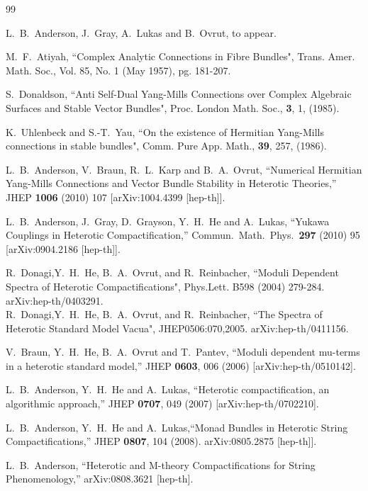 \documentclass[12pt]{article}
\numberwithin{equation}{section}
\begin{document}
\begin{thebibliography}{99}
   
L.~B.~Anderson, J.~Gray, A.~Lukas and B.~Ovrut, to appear.


M.~F.~Atiyah,
``Complex Analytic Connections in Fibre Bundles",
Trans. Amer. Math. Soc., Vol. 85, No. 1 (May 1957), pg. 181-207.

S.~Donaldson,
``Anti Self-Dual Yang-Mills Connections over Complex Algebraic Surfaces and Stable Vector Bundles",
Proc. London Math. Soc., {\bf 3}, 1, (1985).

K.~Uhlenbeck and S.-T.~Yau,
``On the existence of Hermitian Yang-Mills connections in stable bundles", Comm. Pure App. Math., {\bf 39}, 257, (1986).

  L.~B.~Anderson, V.~Braun, R.~L.~Karp and B.~A.~Ovrut,
  ``Numerical Hermitian Yang-Mills Connections and Vector Bundle Stability in
  Heterotic Theories,''
  JHEP {\bf 1006} (2010) 107
  [arXiv:1004.4399 [hep-th]].

  L.~B.~Anderson, J.~Gray, D.~Grayson, Y.~H.~He and A.~Lukas,
  ``Yukawa Couplings in Heterotic Compactification,''
  Commun.\ Math.\ Phys.\  {\bf 297} (2010) 95
  [arXiv:0904.2186 [hep-th]].

R.~Donagi,Y.~H.~He, B.~A.~Ovrut, and R.~Reinbacher,
``Moduli Dependent Spectra of Heterotic Compactifications",
Phys.Lett. B598 (2004) 279-284.  arXiv:hep-th/0403291.\\
R.~Donagi,Y.~H.~He, B.~A.~Ovrut, and R.~Reinbacher,
``The Spectra of Heterotic Standard Model Vacua",
JHEP0506:070,2005.  arXiv:hep-th/0411156.

  V.~Braun, Y.~H.~He, B.~A.~Ovrut and T.~Pantev,
  ``Moduli dependent mu-terms in a heterotic standard model,''
  JHEP {\bf 0603}, 006 (2006)
  [arXiv:hep-th/0510142].
 
L.~B.~Anderson, Y.~H.~He and A.~Lukas,
``Heterotic compactification, an algorithmic approach,''
JHEP {\bf 0707}, 049 (2007) [arXiv:hep-th/0702210].

  L.~B.~Anderson, Y.~H.~He and A.~Lukas,``Monad Bundles in Heterotic String Compactifications,''
  JHEP {\bf 0807}, 104 (2008). arXiv:0805.2875 [hep-th]].
  
  L.~B.~Anderson,
  ``Heterotic and M-theory Compactifications for String Phenomenology,''
  arXiv:0808.3621 [hep-th].


\end{thebibliography}
\end{document}
